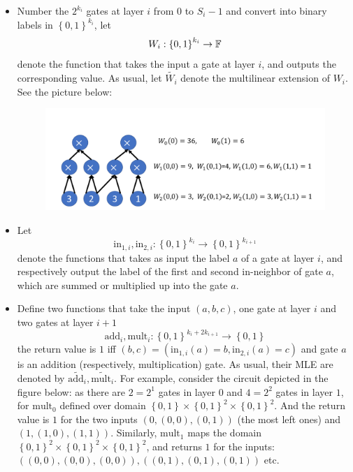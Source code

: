 \documentclass{article}
\begin{document}
\begin{itemize}
\item Number the $2^{k_i}$ gates at layer $i$ from $0$ to $S_i - 1$ and convert into binary labels in $\left\{ 0, 1 \right\}^{k_i}$, let 
\begin{equation*}
W_i: \left\{ 0, 1 \right\}^{k_i} \rightarrow \mathbb{F}
\end{equation*}
denote the function that takes the input a gate at layer $i$, and outputs the corresponding value.
As usual, let $\widetilde{W_i}$ denote the multilinear extension of $W_i$. See the picture below:
\begin{figure}[h]
\centering
\includegraphics[scale=0.3]{GKR_01}
\end{figure} 
\item Let 
\begin{equation*}
\text{in}_{1, i}, \text{in}_{2, i}: \left\{ 0, 1 \right\}^{k_i} \rightarrow \left\{ 0, 1 \right\}^{k_{i+1}}
\end{equation*}
denote the functions that takes as input the label $a$ of a gate at layer $i$, and respectively output the label of the first and second in-neighbor of gate $a$, which are summed or multiplied up into the gate $a$. 
\item Define two functions that take the input $(a,b,c)$, one gate at layer $i$ and two gates at layer $i+1$ 
\begin{equation*}
\text{add}_i, \text{mult}_i: \left\{ 0, 1 \right\}^{k_i + 2k_{i+1}} \rightarrow \left\{ 0, 1 \right\}
\end{equation*}
the return value is $1$ iff $(b, c) = (\text{in}_{1, i}(a) = b, \text{in}_{2, i}(a) = c)$ and gate $a$ is an addition (respectively, multiplication) gate. As usual, their MLE are denoted by $\widetilde{\text{add}_i}, \widetilde{\text{mult}_i}$. For example, consider the circuit depicted in the figure below: as there are $2 = 2^1$ gates in layer $0$ and $4 = 2^2$ gates in layer $1$, for $\text{mult}_0$ defined over domain $\left\{ 0, 1 \right\} \times \left\{ 0, 1 \right\}^2 \times \left\{ 0, 1 \right\}^2$. And the return value is $1$ for the two inputs $(0, (0, 0), (0, 1))$ (the most left ones) and $(1, (1, 0), (1, 1))$. Similarly, $\text{mult}_1$ maps the domain $\left\{ 0, 1 \right\}^2 \times \left\{ 0, 1 \right\}^2 \times \left\{ 0, 1 \right\}^2$, and returns $1$ for the inputs: $((0, 0), (0, 0), (0, 0)), ((0, 1), (0, 1), (0, 1))$ etc. 

\end{itemize}
\end{document}
